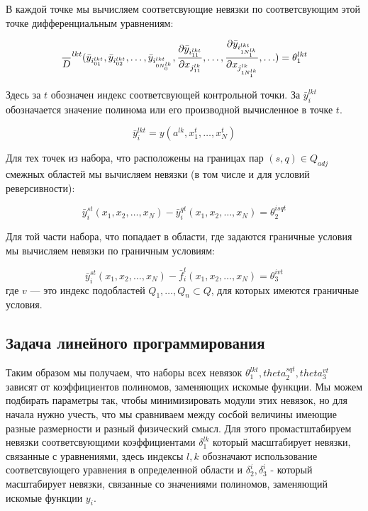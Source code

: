 \documentclass[a4paper,12pt]{article}
\begin{document}
  В каждой точке мы вычисляем соответсвующие невязки по соответсвующим
  этой точке дифференциальным уравнениям:

  \begin{equation}
    \label{res:eq}
    {\over D}^{lkt} ( {\bar y}_{i^{lkt}_{01}}, {\bar y}_{i^{lkt}_{02}},
      \ldots, {\bar y}_{i^{lkt}_{0N^{lk}_0}},\frac{\partial {\bar
          y}_{i^{lkt}_{11}}}{\partial
        x_{j^{lk}_{11}}},\ldots,\frac{\partial {\bar
          y}_{i^{lkt}_{1N^{lk}_1}}}{\partial
        x_{j^{lk}_{1N^{lk}_1}}},\ldots) = \theta^{lkt}_1
  \end{equation}

  Здесь за $t$ обозначен индекс соответсвующей контрольной точки. За
  ${\bar y}_{i}^{lkt}$ обозначается значение полинома или его
  производной вычисленное в точке $t$.

  \begin{equation*}
    {\bar y}_i^{lkt} = y(a^{lk},x^t_1,\ldots, x^t_N)
  \end{equation*}
  
  Для тех точек из набора, что расположены на границах пар $(s,q) \in Q_{adj}$ смежных
  областей мы вычисляем невязки (в том числе и для условий реверсивности):
  
  \begin{equation}
    \label{res:adj}
    {\bar y}_i^{st}\left(x_1,x_2,\ldots,x_N\right) -
    {\bar y}_i^{qt}\left(x_1,x_2,\ldots,x_N\right) = \theta^{isqt}_2
  \end{equation}

  Для той части набора, что попадает в области, где задаются граничные
  условия мы вычисляем невязки по граничным условиям: 

  \begin{equation}
    \label{res:bnd}
    {\bar y}_i^{st}\left(x_1,x_2,\ldots,x_N\right) -
    {\bar f}_i^{t}\left(x_1,x_2,\ldots,x_N\right) = \theta^{ivt}_3
  \end{equation}
  где $v$ --- это индекс подобластей $Q_1,\ldots,Q_n \subset Q$, для
  которых имеются граничные условия.

  \subsection{Задача линейного программирования}
   
  Таким образом мы получаем, что наборы всех невязок
  $\theta^{lkt}_1,theta^{sqt}_2,theta^{vt}_3$ зависят от коэффициентов
  полиномов, заменяющих искомые функции. Мы можем подбирать параметры
  так, чтобы минимизировать модули этих невязок, но для начала нужно учесть,
  что мы сравниваем между сосбой величины имеющие разные размерности и
  разный физический смысл. Для этого промастштабируем невязки
  соответсвующими коэффициентами $\delta^{lk}_1$ который масштабирует
  невязки, связанные с уравнениями, здесь индексы $l,k$ обозначают
  использование соответсвующего уравнения в определенной области и
  $\delta^{i}_2, \delta^{i}_3$ - который масштабирует невязки,
  связанные со значениями полиномов, заменяющий искомые функции $y_i$.
\end{document}
